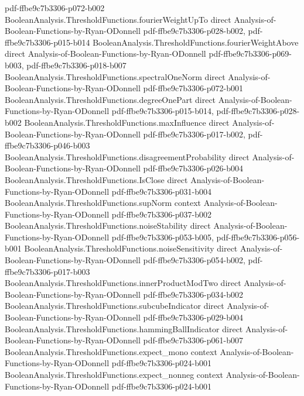 \begin{theorem}
  {pdf-ffbe9c7b3306-p072-b002}
\proofstep
  {BooleanAnalysis.ThresholdFunctions.fourierWeightUpTo}
  {direct}
  {Analysis-of-Boolean-Functions-by-Ryan-ODonnell}
  {pdf-ffbe9c7b3306-p028-b002,
    pdf-ffbe9c7b3306-p015-b014}
\proofstep
  {BooleanAnalysis.ThresholdFunctions.fourierWeightAbove}
  {direct}
  {Analysis-of-Boolean-Functions-by-Ryan-ODonnell}
  {pdf-ffbe9c7b3306-p069-b003,
    pdf-ffbe9c7b3306-p018-b007}
\proofstep
  {BooleanAnalysis.ThresholdFunctions.spectralOneNorm}
  {direct}
  {Analysis-of-Boolean-Functions-by-Ryan-ODonnell}
  {pdf-ffbe9c7b3306-p072-b001}
\proofstep
  {BooleanAnalysis.ThresholdFunctions.degreeOnePart}
  {direct}
  {Analysis-of-Boolean-Functions-by-Ryan-ODonnell}
  {pdf-ffbe9c7b3306-p015-b014,
    pdf-ffbe9c7b3306-p028-b002}
\proofstep
  {BooleanAnalysis.ThresholdFunctions.maxInfluence}
  {direct}
  {Analysis-of-Boolean-Functions-by-Ryan-ODonnell}
  {pdf-ffbe9c7b3306-p017-b002,
    pdf-ffbe9c7b3306-p046-b003}
\proofstep
  {BooleanAnalysis.ThresholdFunctions.disagreementProbability}
  {direct}
  {Analysis-of-Boolean-Functions-by-Ryan-ODonnell}
  {pdf-ffbe9c7b3306-p026-b004}
\proofstep
  {BooleanAnalysis.ThresholdFunctions.IsClose}
  {direct}
  {Analysis-of-Boolean-Functions-by-Ryan-ODonnell}
  {pdf-ffbe9c7b3306-p031-b004}
\proofstep
  {BooleanAnalysis.ThresholdFunctions.supNorm}
  {context}
  {Analysis-of-Boolean-Functions-by-Ryan-ODonnell}
  {pdf-ffbe9c7b3306-p037-b002}
\proofstep
  {BooleanAnalysis.ThresholdFunctions.noiseStability}
  {direct}
  {Analysis-of-Boolean-Functions-by-Ryan-ODonnell}
  {pdf-ffbe9c7b3306-p053-b005,
    pdf-ffbe9c7b3306-p056-b001}
\proofstep
  {BooleanAnalysis.ThresholdFunctions.noiseSensitivity}
  {direct}
  {Analysis-of-Boolean-Functions-by-Ryan-ODonnell}
  {pdf-ffbe9c7b3306-p054-b002,
    pdf-ffbe9c7b3306-p017-b003}
\proofstep
  {BooleanAnalysis.ThresholdFunctions.innerProductModTwo}
  {direct}
  {Analysis-of-Boolean-Functions-by-Ryan-ODonnell}
  {pdf-ffbe9c7b3306-p034-b002}
\proofstep
  {BooleanAnalysis.ThresholdFunctions.subcubeIndicator}
  {direct}
  {Analysis-of-Boolean-Functions-by-Ryan-ODonnell}
  {pdf-ffbe9c7b3306-p029-b004}
\proofstep
  {BooleanAnalysis.ThresholdFunctions.hammingBallIndicator}
  {direct}
  {Analysis-of-Boolean-Functions-by-Ryan-ODonnell}
  {pdf-ffbe9c7b3306-p061-b007}
\proofstep
  {BooleanAnalysis.ThresholdFunctions.expect_mono}
  {context}
  {Analysis-of-Boolean-Functions-by-Ryan-ODonnell}
  {pdf-ffbe9c7b3306-p024-b001}
\proofstep
  {BooleanAnalysis.ThresholdFunctions.expect_nonneg}
  {context}
  {Analysis-of-Boolean-Functions-by-Ryan-ODonnell}
  {pdf-ffbe9c7b3306-p024-b001}

\end{theorem}
